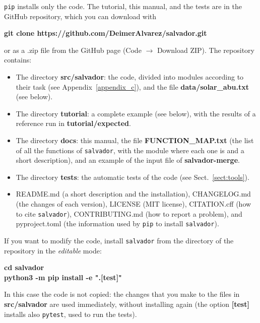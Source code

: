 \documentclass[modern]{aastex701}
\begin{document}
\texttt{pip} installs only the code. The tutorial, this manual, and the tests are in the GitHub repository, which you can download with
\begin{center}
    \textbf{git clone https://github.com/DeimerAlvarez/salvador.git}
\end{center}
or as a .zip file from the GitHub page (Code $\rightarrow$ Download ZIP). The repository contains:
\begin{itemize}
    \item The directory {\bf src/salvador}: the code, divided into modules according to their task (see Appendix~\ref{appendix_c}), and the file {\bf data/solar\_abu.txt} (see below).
    \item The directory {\bf tutorial}: a complete example (see below), with the results of a reference run in {\bf tutorial/expected}.
    \item The directory {\bf docs}: this manual, the file {\bf FUNCTION\_MAP.txt} (the list of all the functions of \texttt{salvador}, with the module where each one is and a short description), and an example of the input file of {\bf salvador-merge}.
    \item The directory {\bf tests}: the automatic tests of the code (see Sect.~\ref{sect:tools}).
    \item README.md (a short description and the installation), CHANGELOG.md (the changes of each version), LICENSE (MIT license), CITATION.cff (how to cite \texttt{salvador}), CONTRIBUTING.md (how to report a problem), and pyproject.toml (the information used by \texttt{pip} to install \texttt{salvador}).
\end{itemize}

If you want to modify the code, install \texttt{salvador} from the directory of the repository in the {\it editable} mode:
\begin{center}
    \textbf{cd salvador} \\
    \textbf{python3 -m pip install -e ".[test]"}
\end{center}
In this case the code is not copied: the changes that you make to the files in {\bf src/salvador} are used immediately, without installing again (the option {\bf [test]} installs also \texttt{pytest}, used to run the tests).
\end{document}
